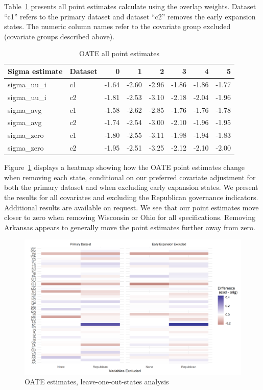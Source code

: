 \documentclass[12pt]{article}
\begin{document}
Table~\ref{tab:oatesensitive} presents all point estimates calculate using the overlap weights. Dataset ``c1'' refers to the primary dataset and dataset ``c2'' removes the early expansion states. The numeric column names refer to the covariate group excluded (covariate groups described above).

\begin{table}[ht]
\centering
\begin{tabular}{llrrrrrr}
  \toprule
Sigma estimate & Dataset & 0 & 1 & 2 & 3 & 4 & 5 \\ 
  \midrule
sigma\_uu\_i & c1 & -1.64 & -2.60 & -2.96 & -1.86 & -1.86 & -1.77 \\ 
  sigma\_uu\_i & c2 & -1.81 & -2.53 & -3.10 & -2.18 & -2.04 & -1.96 \\ 
  sigma\_avg & c1 & -1.58 & -2.62 & -2.85 & -1.76 & -1.76 & -1.78 \\ 
  sigma\_avg & c2 & -1.74 & -2.54 & -3.00 & -2.10 & -1.96 & -1.95 \\ 
  sigma\_zero & c1 & -1.80 & -2.55 & -3.11 & -1.98 & -1.94 & -1.83 \\ 
  sigma\_zero & c2 & -1.95 & -2.51 & -3.25 & -2.12 & -2.10 & -2.00 \\ 
   \bottomrule
\end{tabular}
\caption{OATE all point estimates}
\label{tab:oatesensitive}
\end{table}

Figure~\ref{fig:oateheatmap} displays a heatmap showing how the OATE point estimates change when removing each state, conditional on our preferred covariate adjustment for both the primary dataset and when excluding early expansion states. We present the results for all covariates and excluding the Republican governance indicators. Additional results are available on request. We see that our point estimates move closer to zero when removing Wisconsin or Ohio for all specifications. Removing Arkansas appears to generally move the point estimates further away from zero.

\begin{figure}[]
\begin{center}
    \includegraphics[scale=0.6]{01_Plots/oate-loo-state-cov-group-heatmap-states.png}
    \caption{OATE estimates, leave-one-out-states analysis}
    \label{fig:oateheatmap}
\end{center}
\end{figure}
\end{document}
